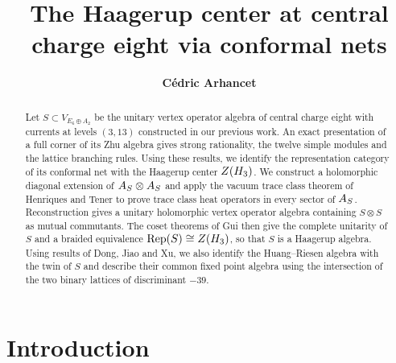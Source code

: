 \documentclass[leqno]{article}
\let\cal\relax
\newcommand{\cal}{\mathcal}
\newcommand{\ot}{\otimes}
\DeclareMathOperator{\Rep}{Rep}
\numberwithin{equation}{section}
\begin{document}
\title{\bfseries{The Haagerup center at central charge eight via conformal nets}}
\date{}
\author{\bfseries{C\'edric Arhancet}}
\maketitle




\begin{abstract}
Let $S\subset V_{E_6\oplus A_2}$ be the unitary vertex operator algebra of central charge eight with currents at levels $(3,13)$ constructed in our previous work. An exact presentation of a full corner of its Zhu algebra gives strong rationality, the twelve simple modules and the lattice branching rules. Using these results, we identify the representation category of its conformal net with the Haagerup center $Z(\cal H_3)$. We construct a holomorphic diagonal extension of $\cal A_S\otimes \cal A_S$ and apply the vacuum trace class theorem of Henriques and Tener to prove trace class heat operators in every sector of $\cal A_S$. Reconstruction gives a unitary holomorphic vertex operator algebra containing $S\ot S$ as mutual commutants. The coset theorems of Gui then give the complete unitarity of $S$ and a braided equivalence $\Rep(S)\cong Z(\cal H_3)$, so that $S$ is a Haagerup algebra. Using results of Dong, Jiao and Xu, we also identify the Huang--Riesen algebra with the twin of $S$ and describe their common fixed point algebra using the intersection of the two binary lattices of discriminant $-39$.
\end{abstract}




\makeatletter
 \renewcommand{\@makefntext}[1]{#1}
 \makeatother

{
  \hypersetup{linkcolor=blue}
 \tableofcontents
}


\section{Introduction}
\label{sec:intro}
\end{document}
